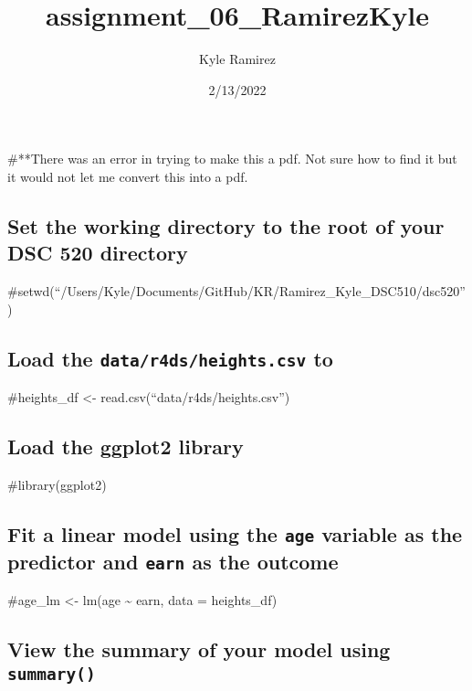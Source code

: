 \documentclass[
]{article}
\title{assignment\_06\_RamirezKyle}
\author{Kyle Ramirez}
\date{2/13/2022}
\begin{document}
\maketitle

\#**There was an error in trying to make this a pdf. Not sure how to
find it but it would not let me convert this into a pdf.

\hypertarget{set-the-working-directory-to-the-root-of-your-dsc-520-directory}{%
\subsection{Set the working directory to the root of your DSC 520
directory}\label{set-the-working-directory-to-the-root-of-your-dsc-520-directory}}

\#setwd(``/Users/Kyle/Documents/GitHub/KR/Ramirez\_Kyle\_DSC510/dsc520'')

\hypertarget{load-the-datar4dsheights.csv-to}{%
\subsection{\texorpdfstring{Load the \texttt{data/r4ds/heights.csv}
to}{Load the data/r4ds/heights.csv to}}\label{load-the-datar4dsheights.csv-to}}

\#heights\_df \textless- read.csv(``data/r4ds/heights.csv'')

\hypertarget{load-the-ggplot2-library}{%
\subsection{Load the ggplot2 library}\label{load-the-ggplot2-library}}

\#library(ggplot2)

\hypertarget{fit-a-linear-model-using-the-age-variable-as-the-predictor-and-earn-as-the-outcome}{%
\subsection{\texorpdfstring{Fit a linear model using the \texttt{age}
variable as the predictor and \texttt{earn} as the
outcome}{Fit a linear model using the age variable as the predictor and earn as the outcome}}\label{fit-a-linear-model-using-the-age-variable-as-the-predictor-and-earn-as-the-outcome}}

\#age\_lm \textless- lm(age \textasciitilde{} earn, data = heights\_df)

\hypertarget{view-the-summary-of-your-model-using-summary}{%
\subsection{\texorpdfstring{View the summary of your model using
\texttt{summary()}}{View the summary of your model using summary()}}\label{view-the-summary-of-your-model-using-summary}}
\end{document}
